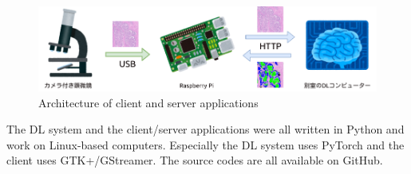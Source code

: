 \vspace{1zh}

\begin{figure}\centering
  \includegraphics[width=\columnwidth]{assets/arch.png}
  \caption{Architecture of client and server applications}
  \label{fig:arch}
\end{figure}

The DL system and the client/server applications were all written in Python and work on Linux-based computers. Especially the DL system uses PyTorch and the client uses GTK+/GStreamer. The source codes are all available on GitHub.\cite{gh-prostate}\cite{unet} \par
